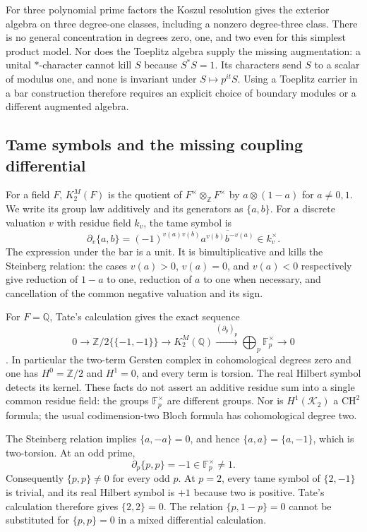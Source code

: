 For three polynomial prime factors the Koszul resolution gives the exterior
algebra on three degree-one classes, including a nonzero degree-three class.
There is no general concentration in degrees zero, one, and two even for this
simplest product model.  Nor does the Toeplitz algebra supply the missing
augmentation: a unital $*$-character cannot kill $S$ because $S^*S=1$.
Its characters send $S$ to a scalar of modulus one, and none is invariant
under $S\mapsto p^{it}S$.
Using a Toeplitz carrier in a bar construction therefore requires an explicit
choice of boundary modules or a different augmented algebra.

\subsection{Tame symbols and the missing coupling differential}
\label{syn-arith:gersten}
For a field $F$, $K_2^M(F)$ is the quotient of
$F^\times\otimes_{\mathbb Z}F^\times$ by $a\otimes(1-a)$ for $a\ne0,1$.
We write its group law additively and its generators as $\{a,b\}$.
For a discrete valuation $v$ with residue field $k_v$, the tame symbol is
\[
 \partial_v\{a,b\}
 =(-1)^{v(a)v(b)}\overline{a^{v(b)}b^{-v(a)}}\in k_v^\times.
\]
The expression under the bar is a unit.  It is bimultiplicative and kills
the Steinberg relation: the cases $v(a)>0$, $v(a)=0$, and $v(a)<0$ respectively
give reduction of $1-a$ to one, reduction of $a$ to one when necessary,
and cancellation of the common negative valuation and its sign.

For $F=\mathbb Q$, Tate's calculation gives the exact sequence
\[
 0\longrightarrow\mathbb Z/2\{\{-1,-1\}\}
 \longrightarrow K_2^M(\mathbb Q)
 \xrightarrow{(\partial_p)_p}\bigoplus_p\mathbb F_p^\times
 \longrightarrow0
\]
\cite[\S11]{syn-arith:MilnorK}.
In particular the two-term Gersten complex in cohomological degrees zero and
one has $H^0=\mathbb Z/2$ and $H^1=0$, and every term is torsion.
The real Hilbert symbol detects its kernel.
These facts do not assert an additive residue sum into a single common
residue field: the groups $\mathbb F_p^\times$ are different groups.
Nor is $H^1(\mathcal K_2)$ a $\mathrm{CH}^2$ formula; the usual codimension-two
Bloch formula has cohomological degree two.

\begin{example}
The Steinberg relation implies $\{a,-a\}=0$, and hence
$\{a,a\}=\{a,-1\}$, which is two-torsion.  At an odd prime,
\[
 \partial_p\{p,p\}=-1\in\mathbb F_p^\times\ne1.
\]
Consequently $\{p,p\}\ne0$ for every odd $p$.
At $p=2$, every tame symbol of $\{2,-1\}$ is trivial, and its real Hilbert
symbol is $+1$ because two is positive.  Tate's calculation therefore gives
$\{2,2\}=0$.
The relation $\{p,1-p\}=0$ cannot be substituted for $\{p,p\}=0$ in a
mixed differential calculation.
\end{example}

